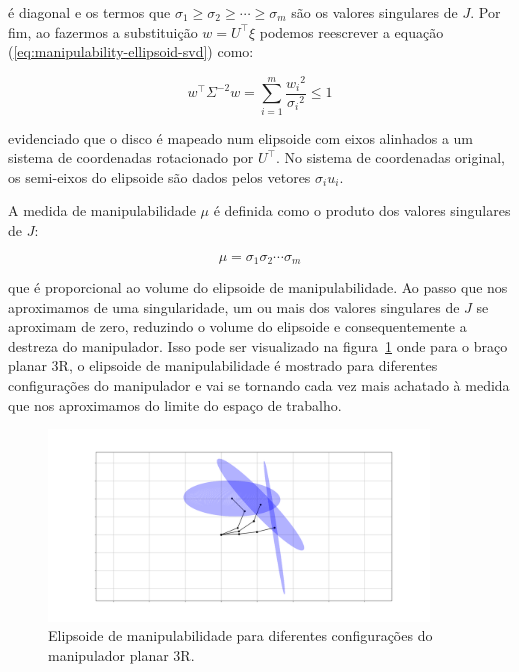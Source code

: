 é diagonal e os termos que \(\sigma_1 \geq \sigma_2 \geq \cdots \geq \sigma_m\) são os valores
singulares de \(J\). Por fim, ao fazermos a substituição \(w = U^\top \xi\) podemos reescrever a equação
(\ref{eq:manipulability-ellipsoid-svd}) como:

\begin{equation}
    w^\top \Sigma^{-2} w = \sum_{i=1}^m{\frac{{w_i}^2}{{\sigma_i}^2}} \leq 1
\end{equation}

evidenciado que o disco é mapeado num elipsoide com eixos alinhados a um
sistema de coordenadas rotacionado por \(U^\top\). No sistema de coordenadas
original, os semi-eixos do elipsoide são dados pelos vetores \(\sigma_i u_i\).

A medida de manipulabilidade \(\mu\) é definida como o produto dos valores
singulares de \(J\):

\begin{equation}\label{eq:manipulability}
    \mu = \sigma_1 \sigma_2 \cdots \sigma_m
\end{equation}

que é proporcional ao volume do elipsoide de manipulabilidade. Ao passo que nos
aproximamos de uma singularidade, um ou mais dos valores singulares de \(J\) se
aproximam de zero, reduzindo o volume do elipsoide e consequentemente a
destreza do manipulador. Isso pode ser visualizado na
figura~\ref{fig:manipulability-ellipsoid} onde para o braço planar 3R, o
elipsoide de manipulabilidade é mostrado para diferentes configurações do
manipulador e vai se tornando cada vez mais achatado à medida que nos
aproximamos do limite do espaço de trabalho.

\begin{figure}
    \centering
    \includegraphics[width=0.9\textwidth]{Images/3r-ellipsoid.png}
    \caption{Elipsoide de manipulabilidade para diferentes configurações do manipulador planar 3R.}\label{fig:manipulability-ellipsoid}
\end{figure}

